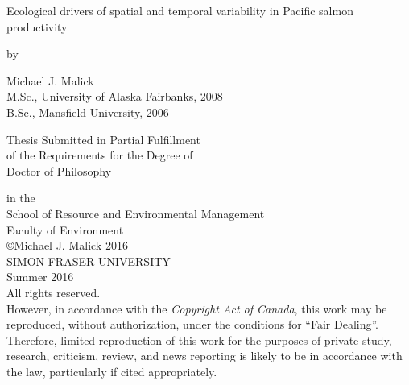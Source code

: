 


\vspace*{3mm}
\begin{center}

\begin{spacing}{2.0}
{ \Large Ecological drivers of spatial and temporal variability in Pacific
salmon productivity}
\end{spacing}

\vspace{5mm}
by
\vspace{5mm}

\begin{doublespace}
Michael J. Malick  \\
M.Sc., University of Alaska Fairbanks, 2008 \\
B.Sc., Mansfield University, 2006 \\
\end{doublespace}

\vspace{10mm}
Thesis Submitted in Partial Fulfillment \\
of the Requirements for the Degree of \\

\vspace{5mm}
Doctor of Philosophy \\
\vspace{5mm}

in the \\
School of Resource and Environmental Management \\
Faculty of Environment \\

\vspace{10mm}
\copyright Michael J. Malick 2016 \\
SIMON FRASER UNIVERSITY \\
Summer 2016 \\

\vspace{15mm}
All rights reserved. \\
However, in accordance with the \emph{Copyright Act of Canada},
this work may be reproduced, without authorization, under the conditions for
``Fair Dealing''. Therefore, limited reproduction of this work for the purposes
of private study, research, criticism, review, and news reporting is likely to
be in accordance with the law, particularly if cited appropriately.


\end{center}



